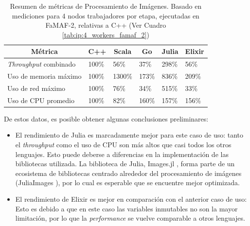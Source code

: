 \documentclass[11pt]{article}
\newcommand{\english}[1]{\textit{#1}}
\begin{document}
\begin{table}[h]
\centering
\begin{tabular}{|l|l|l|l|l|l|}
\hline
\multicolumn{1}{|c|}{Métrica} & \multicolumn{1}{c|}{C++} & \multicolumn{1}{c|}{Scala} & \multicolumn{1}{c|}{Go} & \multicolumn{1}{c|}{Julia} & \multicolumn{1}{c|}{Elixir} \\ \hline
\english{Throughput} combinado           & 100\%                    & 56\%                       & 37\%                    & 298\%                      & 56\%                        \\ \hline
Uso de memoria máximo              & 100\%                    & 1300\%                     & 173\%                   & 836\%                      & 209\%                       \\ \hline
Uso de red máximo             & 100\%                    & 76\%                       & 34\%                    & 515\%                      & 33\%                        \\ \hline
Uso de CPU promedio                 & 100\%                    & 82\%                       & 160\%                   & 157\%                      & 156\%                       \\ \hline
\end{tabular}
\caption{Resumen de métricas de Procesamiento de Imágenes. Basado en mediciones para 4 nodos trabajadores por etapa, ejecutadas en FaMAF-2, relativas a C++ (Ver Cuadro \ref{tab:ip:4_workers_famaf_2})}
\label{tab:sis_dist:ip_metrics}
\end{table}

De estos datos, es posible obtener algunas conclusiones preliminares:

\begin{itemize}
    \item El rendimiento de Julia es marcadamente mejor para este caso de uso: tanto el \english{throughput} como el uso de CPU son más altos que casi todos los otros lenguajes. Esto puede deberse a diferencias en la implementación de las bibliotecas utilizada. La biblioteca de Julia, Images.jl \cite{jl:lib:images}, forma parte de un ecosistema de bibliotecas centrado alrededor del procesamiento de imágenes (JuliaImages \cite{jl:lib:juliaimages}), por lo cual es esperable que se encuentre mejor optimizada.
    \item El rendimiento de Elixir es mejor en comparación con el anterior caso de uso: Esto es debido a que en este caso las variables inmutables no son la mayor limitación, por lo que la \english{performance} se vuelve comparable a otros lenguajes.
\end{itemize}
\end{document}

